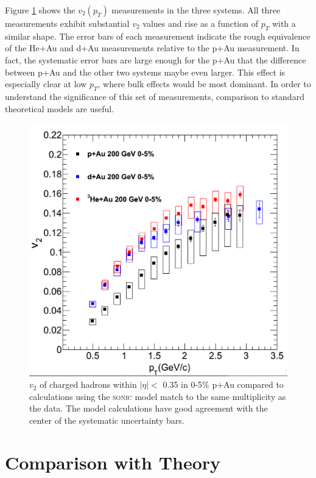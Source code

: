 Figure  \ref{fig:v2_3_sys_compare_nohydro} shows the $v_2(p_T)$ measurements in the three systems. All three measurements exhibit substantial $v_2$ values and rise as a function of $p_T$ with a similar shape. The error bars of each measurement indicate the rough equivalence of the He+Au and d+Au measurements relative to the p+Au measurement. In fact, the systematic error bars are large enough for the p+Au that the difference between p+Au and the other two systems maybe even larger. This effect is especially clear at low $p_T$, where bulk effects would be most dominant. In order to understand the significance of this set of measurements, comparison to standard theoretical models are useful.

\begin{figure}[!ht]
\begin{center}
\includegraphics[width=0.65\linewidth]{figs/v2_3_sys_compare_nohydro.png}
\caption{$v_2$ of charged hadrons within $|\eta| <$ 0.35 in 0-5\% p+Au compared to calculations using the \textsc{sonic} model match to the same multiplicity as the data. The model calculations have good agreement with the center of the systematic uncertainty bars.}
\label{fig:v2_3_sys_compare_nohydro}
\end{center}
\end{figure}

\section{Comparison with Theory}

